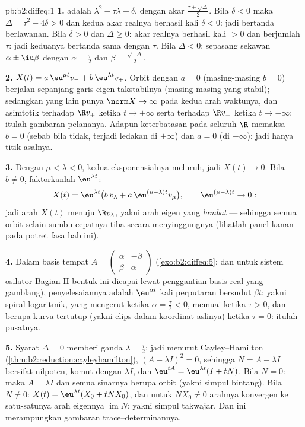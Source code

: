 \begin{solution}{pb:b2:diffeq:1}
\textbf{1.}  adalah $\lambda^2 -
\tau\lambda + \delta$, dengan akar
$\frac{\tau\pm\sqrt\Delta}{2}$. Bila $\delta < 0$ maka $\Delta =
\tau^2 - 4\delta > 0$ dan kedua akar realnya berhasil kali
$\delta < 0$: jadi bertanda berlawanan. Bila $\delta > 0$ dan $\Delta \geq
0$: akar realnya berhasil kali $> 0$ dan berjumlah $\tau$: jadi keduanya bertanda
sama dengan $\tau$. Bila $\Delta < 0$: sepasang sekawan $\alpha \pm
\iu\beta$ dengan $\alpha = \frac\tau2$ dan $\beta =
\frac{\sqrt{-\Delta}}2$.

\textbf{2.} $X(t) = a\,\eu^{\mu t}v_- + b\,\eu^{\lambda t}v_+$.
Orbit dengan $a = 0$ (masing-masing $b = 0$) berjalan sepanjang garis eigen
takstabilnya (masing-masing yang stabil); sedangkan yang lain punya $\norm X \to \infty$
pada kedua arah waktunya, dan asimtotik terhadap $\R v_+$ ketika $t \to
+\infty$ serta terhadap $\R v_-$ ketika $t \to -\infty$: itulah gambaran
pelananya. Adapun keterbatasan pada seluruh $\R$ memaksa $b = 0$ (sebab bila tidak, terjadi
ledakan di $+\infty$) dan $a = 0$ (di $-\infty$): jadi hanya
titik asalnya.

\textbf{3.} Dengan $\mu < \lambda < 0$, kedua eksponensialnya meluruh, jadi
$X(t) \to 0$. Bila $b \neq 0$, faktorkanlah $\eu^{\lambda t}$:
\[
X(t) = \eu^{\lambda t}\bigl(b\,v_\lambda + a\,\eu^{(\mu -
\lambda)t}v_\mu\bigr),
\qquad \eu^{(\mu-\lambda)t} \to 0 :
\]
jadi arah $X(t)$ menuju $\R v_\lambda$, yakni arah eigen yang
\emph{lambat} --- sehingga semua orbit selain sumbu cepatnya
tiba secara menyinggungnya (lihatlah panel kanan pada potret fasa
bab ini).

\textbf{4.} Dalam basis tempat $A = \begin{pmatrix} \alpha &
-\beta\\ \beta & \alpha\end{pmatrix}$
(\cref{exo:b2:diffeq:5}; dan untuk sistem osilator Bagian II
bentuk ini dicapai lewat penggantian basis real yang gamblang),
penyelesaiannya adalah $\eu^{\alpha t}$ kali perputaran bersudut $\beta
t$: yakni spiral logaritmik, yang mengerut ketika $\alpha = \frac\tau2
< 0$, memuai ketika $\tau > 0$, dan berupa kurva tertutup (yakni elips
dalam koordinat aslinya) ketika $\tau = 0$: itulah pusatnya.

\textbf{5.} Syarat $\Delta = 0$ memberi  ganda $\lambda =
\frac\tau2$; jadi menurut Cayley--Hamilton
(\cref{thm:b2:reduction:cayleyhamilton}), $(A - \lambda I)^2 =
0$, sehingga $N = A - \lambda I$ bersifat nilpoten, komut dengan
$\lambda I$, dan $\eu^{tA} = \eu^{\lambda t}(I + tN)$. Bila $N =
0$: maka $A = \lambda I$ dan semua sinarnya berupa orbit (yakni simpul bintang). Bila $N
\neq 0$: $X(t) = \eu^{\lambda t}(X_0 + tNX_0)$, dan untuk $NX_0
\neq 0$ arahnya konvergen ke satu-satunya arah eigennya
$\operatorname{im}N$: yakni simpul takwajar. Dan ini merampungkan
gambaran trace--determinannya.


\end{solution}

